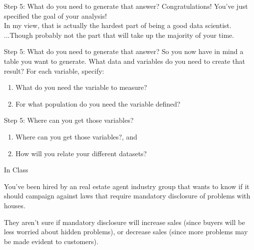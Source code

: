 \documentclass[11pt]{beamer}
\begin{document}
\begin{frame}[c]{Step 5: What do you need to generate that answer?}
  Congratulations! You've just specified the goal of your analysis! \\
  \pause In my view, that is actually the hardest part of being a good data scientist. \\
  \pause ...Though probably not the part that will take up the majority of your time.
\end{frame}

\begin{frame}[c]{Step 5: What do you need to generate that answer?}
  So you now have in mind a table you want to generate. What data and variables do you need to create that result?
  \pause
  \pause For each variable, specify:
  \begin{enumerate}
    \item What do you need the variable to measure?
    \item For what population do you need the variable defined?
  \end{enumerate}
\end{frame}

\begin{frame}[c]{Step 5: Where can you get those variables?}
  \begin{enumerate}
    \item Where can you get those variables?, and
    \item How will you relate your different datasets?
  \end{enumerate}
\end{frame}

\begin{frame}[c]{In Class}

You've been hired by an real estate agent industry group that wants to know if it should campaign against laws that require mandatory disclosure of problems with houses.

They aren't sure if mandatory disclosure will increase sales (since buyers will be less worried about hidden problems), or decrease sales (since more problems may be made evident to customers).

\end{frame}
\end{document}

